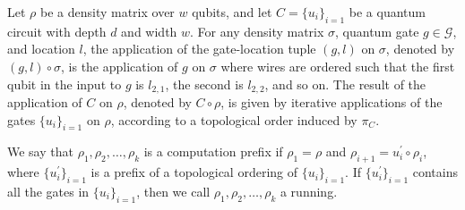 \begin{definition}
  Let $\rho$ be a density matrix over $w$ qubits, and let $C = \{u_{i}\}_{i=1}$ be a quantum circuit with depth $d$ and width $w$. For any density matrix $\sigma$, quantum gate $g \in \mathcal{G}$, and location $l$, the application of the gate-location tuple $(g,l)$ on $\sigma$, denoted by $(g,l) \circ \sigma$, is the application of $g$ on $\sigma$ where wires are ordered such that the first qubit in the input to $g$ is $l_{2,1}$, the second is $l_{2,2}$, and so on. The result of the application of $C$ on $\rho$, denoted by $C \circ \rho$, is given by iterative applications of the gates $\{u_{i}\}_{i=1}$ on $\rho$, according to a topological order induced by $\pi_{C}$.

  We say that $\rho_{1}, \rho_{2}, \ldots, \rho_{k}$ is a computation prefix if $\rho_{1} = \rho$ and $\rho_{i+1} = u^\prime_{i} \circ \rho_{i}$, where $\{u^{\prime}_{i}\}_{i=1}$ is a prefix of a topological ordering of $\{u_{i}\}_{i=1}$. If $\{u^{\prime}_{i}\}_{i=1}$ contains all the gates in $\{u_{i}\}_{i=1}$, then we call $\rho_{1}, \rho_{2}, \ldots, \rho_{k}$ a running.
\end{definition}

